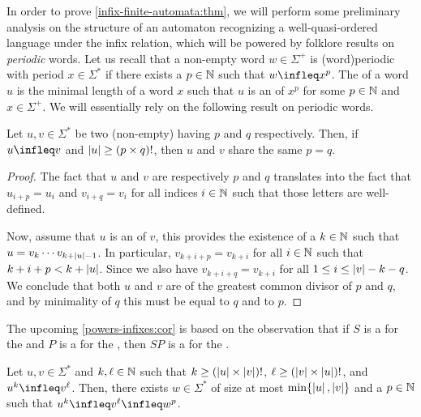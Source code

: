 \AP In order to prove \cref{infix-finite-automata:thm}, we will perform some
preliminary analysis on the structure of an automaton recognizing a
well-quasi-ordered language under the infix relation, which will be powered by
folklore results on \emph{periodic} words. Let us recall that a non-empty word
$w \in \Sigma^+$ is \intro(word){periodic} with period $x \in \Sigma^*$ if
there exists a $p \in \mathbb{N}$ such that $w \infleq x^p$. The  of a word $u$ is the minimal length of a word $x$ such that $u$ is an
 of $x^p$ for some $p \in \mathbb{N}$ and $x \in \Sigma^+$. We will
essentially rely on the following result on periodic words.

\begin{lemma}
    \label{periodic-infixes:lem}
    Let $u,v \in \Sigma^*$ be two (non-empty) 
    having  $p$ and $q$ respectively.
    Then, if $u \infleq v$ and $\card{u} \geq \factorial[p]{p \times q}$,
    then $u$ and $v$ share the same 
    $p = q$.
\end{lemma}
\begin{proof}
    The fact that $u$ and $v$ are 
    respectively $p$ and $q$ translates into the fact that $u_{i+p} = u_i$ and
    $v_{i+q} = v_i$ for all indices $i \in \mathbb{N}$ such that those letters are
    well-defined.

    Now, assume that $u$ is an  of $v$, this provides the existence
    of a $k \in \mathbb{N}$ such that $u = v_{k} \cdots v_{k + \left| u \right| - 1}$. In
    particular, $v_{k+i+p} = v_{k+i}$ for all $i \in \mathbb{N}$ such that $k+i+p < k
    + \left| u \right|$. Since we also have $v_{k+i+q} = v_{k+i}$ for all $1 \leq i
    \leq \left| v \right| - k - q$. We conclude that both $u$ and $v$ are of
     the greatest common divisor of $p$ and $q$, and by
    minimality of $q$ this must be equal to $q$ and to $p$.
\end{proof}

The upcoming \cref{powers-infixes:cor} is based on the observation that if $S$
is a  for the  and $P$ is a  for the
, then $SP$ is a  for the .

\begin{corollary}
    \label{powers-infixes:cor}
    Let $u,v \in \Sigma^*$ and $k, \ell \in \mathbb{N}$
    such that $k \geq \factorial[p]{\card{u} \times \card{v}}$,
    $\ell \geq \factorial[p]{\card{v} \times \card{u}}$,
    and $u^k \infleq v^\ell$.
    Then, there exists $w \in \Sigma^*$ of size at most
    $\min \{ \left| u \right|, \left| v \right| \}$ and a $p \in \mathbb{N}$
    such that
    $u^k \infleq v^\ell \infleq w^p$.
\end{corollary}

